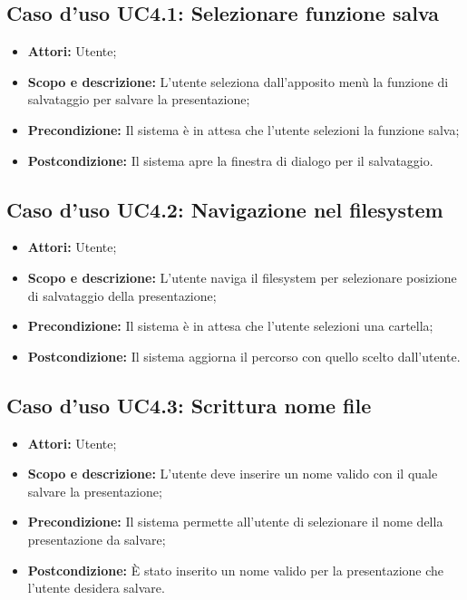 \subsection{Caso d'uso UC4.1: Selezionare funzione salva}
\begin{itemize}
	\item \textbf{Attori:} Utente;
	\item \textbf{Scopo e descrizione:} L'utente seleziona dall'apposito menù la funzione di salvataggio per salvare la presentazione;
	\item \textbf{Precondizione:} Il sistema è in attesa che l'utente selezioni la funzione salva;
	\item \textbf{Postcondizione:} Il sistema apre la finestra di dialogo per il salvataggio.
\end{itemize}

\subsection{Caso d'uso UC4.2: Navigazione nel filesystem}
\begin{itemize}
	\item \textbf{Attori:} Utente;
	\item \textbf{Scopo e descrizione:} L'utente naviga il filesystem per selezionare posizione di salvataggio della presentazione;
	\item \textbf{Precondizione:} Il sistema è in attesa che l'utente selezioni una cartella;
	\item \textbf{Postcondizione:} Il sistema aggiorna il percorso con quello scelto dall'utente.
\end{itemize}

\subsection{Caso d'uso UC4.3: Scrittura nome file}
\begin{itemize}
	\item \textbf{Attori:} Utente;
	\item \textbf{Scopo e descrizione:} L'utente deve inserire un nome valido con il quale salvare la presentazione;
	\item \textbf{Precondizione:} Il sistema permette all'utente di selezionare il nome della presentazione da salvare;
	\item \textbf{Postcondizione:} È stato inserito un nome valido per la presentazione che l'utente desidera salvare.
\end{itemize}

